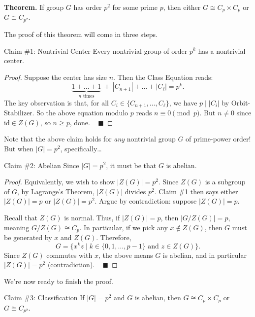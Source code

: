 \begin{boxed-text}[42em]
\textbf{Theorem.} If group $G$ has order $p^2$ for some prime $p$, then either $G \cong C_p \times C_p$ or $G \cong C_{p^2}$.
\end{boxed-text}

The proof of this theorem will come in three steps.

\begin{theorem}{Claim \#1: Nontrivial Center}
    Every nontrivial group of order $p^k$ has a nontrivial center.
\end{theorem}

\begin{proof}
    Suppose the center has size $n$.  Then the Class Equation reads:
    \[ \underbrace{1 + \dots + 1}_{n \text{ times}} ~ + ~ |C_{n + 1}| + \dots + |C_\ell| = p^k. \]
    The key observation is that, for all $C_i \in \{C_{n + 1}, \dots, C_{\ell}\}$, we have $p \mid |C_i|$ by Orbit-Stabilizer.  So the above equation modulo $p$ reads $n \equiv 0 \pmod{p}$.  But $n \neq 0$ since $\mathrm{id} \in Z(G)$, so $n \geq p$, done. ~ $\blacksquare$
\end{proof}

Note that the above claim holds for \emph{any} nontrivial group $G$ of prime-power order!  But when $|G| = p^2$, specifically\dots

\begin{theorem}{Claim \#2: Abelian}
    Since $|G| = p^2$, it must be that $G$ is abelian.
\end{theorem}

\begin{proof}
    Equivalently, we wish to show $|Z(G)| = p^2$.  Since $Z(G)$ is a subgroup of $G$, by Lagrange's Theorem, $|Z(G)|$ divides $p^2$.  Claim \#1 then says either $|Z(G)| = p$ or $|Z(G)| = p^2$.  Argue by contradiction: suppose $|Z(G)| = p$.

    Recall that $Z(G)$ is normal.  Thus, if $|Z(G)| = p$, then $|G / Z(G)| = p$, meaning $G / Z(G) \cong C_p$.  In particular, if we pick any $x \not \in Z(G)$, then $G$ must be generated by $x$ and $Z(G)$.  Therefore,
    \[ G = \{x^k z \mid k \in \{0, 1, \dots, p - 1\} \text{ and } z \in Z(G)\}. \]
    Since $Z(G)$ commutes with $x$, the above means $G$ is abelian, and in particular $|Z(G)| = p^2$ (contradiction).  ~ $\blacksquare$
\end{proof}

We're now ready to finish the proof.

\begin{theorem}{Claim \#3: Classification}
    If $|G| = p^2$ and $G$ is abelian, then $G \cong C_p \times C_p$ or $G \cong C_{p^2}$.
\end{theorem}

